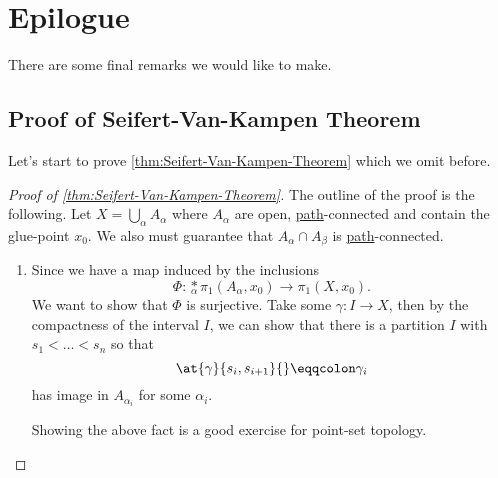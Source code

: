 \chapter{Epilogue}
There are some final remarks we would like to make.
\section{Proof of Seifert-Van-Kampen Theorem}
Let's start to prove \autoref{thm:Seifert-Van-Kampen-Theorem} which we omit before.
\begin{proof}[Proof of \autoref{thm:Seifert-Van-Kampen-Theorem}]\label{pf:thm:Seifert-Van-Kampen-Theorem}
	The outline of the proof is the following. Let \(X = \bigcup_{\alpha}A_\alpha \) where \(A_\alpha \) are open, \hyperref[def:path]{path}-connected and contain the glue-point \(x_0\). We also must guarantee that \(A_\alpha \cap A_\beta \) is \hyperref[def:path]{path}-connected.

	\begin{enumerate}
		\item Since we have a map induced by the inclusions
		      \[
			      \Phi \colon \underset{\alpha}{\ast} \pi _1(A_\alpha , x_0)\to \pi _1(X, x_0).
		      \]
		      We want to show that \(\Phi \) is surjective. Take some \(\gamma \colon I\to X\), then by the compactness of the interval \(I\), we can show that there is a partition \(I\) with \(s_1<\dots <s_n \) so that
		      \[
			      \at{\gamma }{s_{i}, s_{i+1}}{} \eqqcolon \gamma _{i}
		      \]
		      has image in \(A_{\alpha_{i}}\) for some \(\alpha _{i}\).

		      \begin{exercise}
			      Showing the above fact is a good exercise for point-set topology.
		      \end{exercise}


\end{enumerate}
\end{proof}
